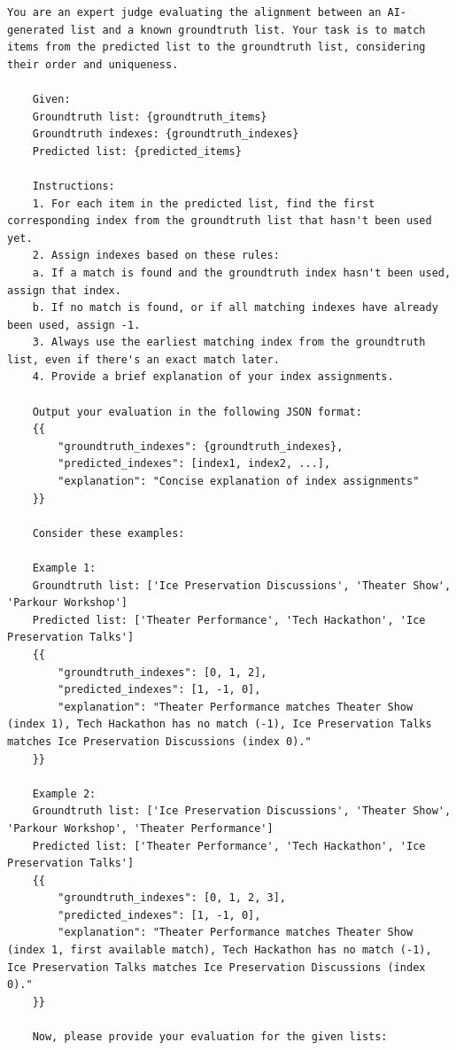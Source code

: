 \documentclass{article}
\begin{document}
\begin{lstlisting}[style=mystyle, caption={Template of the evaluation prompt for extracting the items matching between the identified and the ground truth items. The ground truth indexes are always set to 0,...,N-1, with N the length of the ground truth.}, label={lst:evaluation_prompt_chrono}]
You are an expert judge evaluating the alignment between an AI-generated list and a known groundtruth list. Your task is to match items from the predicted list to the groundtruth list, considering their order and uniqueness.

    Given:
    Groundtruth list: {groundtruth_items}
    Groundtruth indexes: {groundtruth_indexes}
    Predicted list: {predicted_items}

    Instructions:
    1. For each item in the predicted list, find the first corresponding index from the groundtruth list that hasn't been used yet.
    2. Assign indexes based on these rules:
    a. If a match is found and the groundtruth index hasn't been used, assign that index.
    b. If no match is found, or if all matching indexes have already been used, assign -1.
    3. Always use the earliest matching index from the groundtruth list, even if there's an exact match later.
    4. Provide a brief explanation of your index assignments.

    Output your evaluation in the following JSON format:
    {{
        "groundtruth_indexes": {groundtruth_indexes},
        "predicted_indexes": [index1, index2, ...],
        "explanation": "Concise explanation of index assignments"
    }}

    Consider these examples:

    Example 1:
    Groundtruth list: ['Ice Preservation Discussions', 'Theater Show', 'Parkour Workshop']
    Predicted list: ['Theater Performance', 'Tech Hackathon', 'Ice Preservation Talks']
    {{
        "groundtruth_indexes": [0, 1, 2],
        "predicted_indexes": [1, -1, 0],
        "explanation": "Theater Performance matches Theater Show (index 1), Tech Hackathon has no match (-1), Ice Preservation Talks matches Ice Preservation Discussions (index 0)."
    }}

    Example 2:
    Groundtruth list: ['Ice Preservation Discussions', 'Theater Show', 'Parkour Workshop', 'Theater Performance']
    Predicted list: ['Theater Performance', 'Tech Hackathon', 'Ice Preservation Talks']
    {{
        "groundtruth_indexes": [0, 1, 2, 3],
        "predicted_indexes": [1, -1, 0],
        "explanation": "Theater Performance matches Theater Show (index 1, first available match), Tech Hackathon has no match (-1), Ice Preservation Talks matches Ice Preservation Discussions (index 0)."
    }}

    Now, please provide your evaluation for the given lists:
\end{lstlisting}
\end{document}
